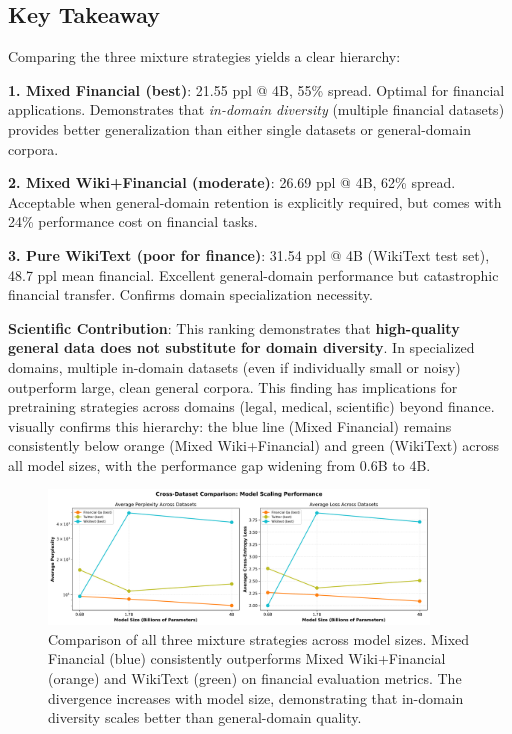 

\subsection{Key Takeaway}

Comparing the three mixture strategies yields a clear hierarchy:

\textbf{1. Mixed Financial (best)}: 21.55 ppl @ 4B, 55\% spread. Optimal for financial applications. Demonstrates that \textit{in-domain diversity} (multiple financial datasets) provides better generalization than either single datasets or general-domain corpora.

\textbf{2. Mixed Wiki+Financial (moderate)}: 26.69 ppl @ 4B, 62\% spread. Acceptable when general-domain retention is explicitly required, but comes with 24\% performance cost on financial tasks.

\textbf{3. Pure WikiText (poor for finance)}: 31.54 ppl @ 4B (WikiText test set), 48.7 ppl mean financial. Excellent general-domain performance but catastrophic financial transfer. Confirms domain specialization necessity.

\textbf{Scientific Contribution}: This ranking demonstrates that \textbf{high-quality general data does not substitute for domain diversity}. In specialized domains, multiple in-domain datasets (even if individually small or noisy) outperform large, clean general corpora. This finding has implications for pretraining strategies across domains (legal, medical, scientific) beyond finance.  visually confirms this hierarchy: the blue line (Mixed Financial) remains consistently below orange (Mixed Wiki+Financial) and green (WikiText) across all model sizes, with the performance gap widening from 0.6B to 4B.

\begin{figure}[h]
\centering
\includegraphics[width=0.9\textwidth]{figures/scaling_comparison_all.png}
\caption[Comparison of Mixture Strategies]{Comparison of all three mixture strategies across model sizes. Mixed Financial (blue) consistently outperforms Mixed Wiki+Financial (orange) and WikiText (green) on financial evaluation metrics. The divergence increases with model size, demonstrating that in-domain diversity scales better than general-domain quality.}
\label{fig:scaling_comparison_all}
\end{figure}

